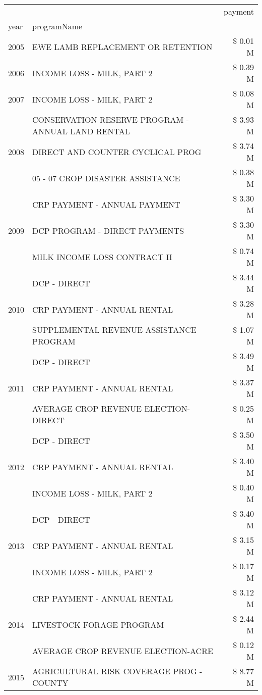\begin{tabular}{llr}
\toprule
 &  & payment \\
year & programName &  \\
\midrule
2005 & EWE LAMB REPLACEMENT OR RETENTION & \$ 0.01 M \\
\cline{1-3}
2006 & INCOME LOSS - MILK, PART 2 & \$ 0.39 M \\
\cline{1-3}
2007 & INCOME LOSS - MILK, PART 2 & \$ 0.08 M \\
\cline{1-3}
\multirow[t]{3}{*}{2008} & CONSERVATION RESERVE PROGRAM - ANNUAL LAND RENTAL & \$ 3.93 M \\
 & DIRECT AND COUNTER CYCLICAL PROG & \$ 3.74 M \\
 & 05 - 07 CROP DISASTER ASSISTANCE & \$ 0.38 M \\
\cline{1-3}
\multirow[t]{3}{*}{2009} & CRP PAYMENT - ANNUAL PAYMENT & \$ 3.30 M \\
 & DCP PROGRAM - DIRECT PAYMENTS & \$ 3.30 M \\
 & MILK INCOME LOSS CONTRACT II & \$ 0.74 M \\
\cline{1-3}
\multirow[t]{3}{*}{2010} & DCP - DIRECT & \$ 3.44 M \\
 & CRP PAYMENT - ANNUAL RENTAL & \$ 3.28 M \\
 & SUPPLEMENTAL REVENUE ASSISTANCE PROGRAM & \$ 1.07 M \\
\cline{1-3}
\multirow[t]{3}{*}{2011} & DCP - DIRECT & \$ 3.49 M \\
 & CRP PAYMENT - ANNUAL RENTAL & \$ 3.37 M \\
 & AVERAGE CROP REVENUE ELECTION-DIRECT & \$ 0.25 M \\
\cline{1-3}
\multirow[t]{3}{*}{2012} & DCP - DIRECT & \$ 3.50 M \\
 & CRP PAYMENT - ANNUAL RENTAL & \$ 3.40 M \\
 & INCOME LOSS - MILK, PART 2 & \$ 0.40 M \\
\cline{1-3}
\multirow[t]{3}{*}{2013} & DCP - DIRECT & \$ 3.40 M \\
 & CRP PAYMENT - ANNUAL RENTAL & \$ 3.15 M \\
 & INCOME LOSS - MILK, PART 2 & \$ 0.17 M \\
\cline{1-3}
\multirow[t]{3}{*}{2014} & CRP PAYMENT - ANNUAL RENTAL & \$ 3.12 M \\
 & LIVESTOCK FORAGE PROGRAM & \$ 2.44 M \\
 & AVERAGE CROP REVENUE ELECTION-ACRE & \$ 0.12 M \\
\cline{1-3}
\multirow[t]{3}{*}{2015} & AGRICULTURAL RISK COVERAGE PROG - COUNTY & \$ 8.77 M \\

\end{tabular}
